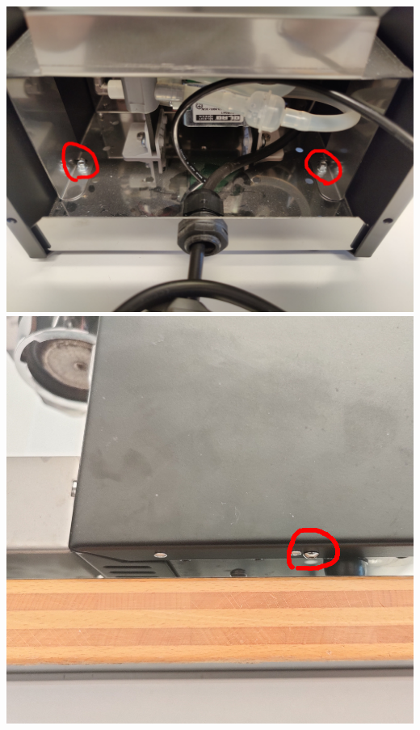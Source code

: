 \documentclass[]{article}
\begin{document}
\begin{minipage}[t]{0.4\linewidth}
	\vspace{0pt}
	\includegraphics[width=\linewidth]{images/03_installation/06_remove_divider_screws1.jpg}
	\includegraphics[width=\linewidth]{images/03_installation/07_remove_divider_screws2.jpg}

\end{minipage}
\end{document}
